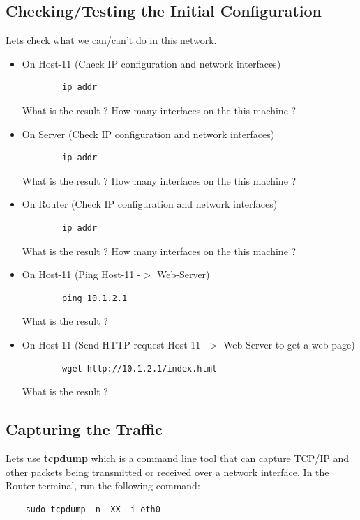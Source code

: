 \subsection{Checking/Testing the Initial Configuration}\label{Checking/Testing the Initial Configuration}
Lets check what we can/can't do in this network.
\newline
\begin{itemize}
	\item On Host-11 (Check IP configuration and network interfaces)
	\begin{verbatim}
	    ip addr
	\end{verbatim}

	What is the result ? How many interfaces on the this machine ?

	\item On Server (Check IP configuration and network interfaces)
	\begin{verbatim}
	    ip addr
	\end{verbatim}

	What is the result ? How many interfaces on the this machine ?

	\item On Router (Check IP configuration and network interfaces)
	\begin{verbatim}
	    ip addr
	\end{verbatim}

	What is the result ? How many interfaces on the this machine ?

	\item On Host-11 (Ping Host-11 -$>$ Web-Server)
	\begin{verbatim}
	    ping 10.1.2.1
	\end{verbatim}

	What is the result ?
	\item On Host-11 (Send HTTP request Host-11 -$>$ Web-Server to get a web page)
	\begin{verbatim}
	    wget http://10.1.2.1/index.html
	\end{verbatim}

	What is the result ?
\end{itemize}

\subsection{Capturing the Traffic}
Lets use \textbf{tcpdump} which is a command line tool that can capture TCP/IP and other packets being transmitted or received over a network interface.
\newline
\newline
In the Router terminal, run the following command:
\begin{verbatim}
    sudo tcpdump -n -XX -i eth0
\end{verbatim}

